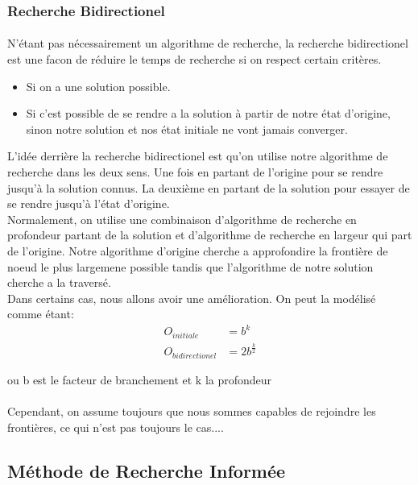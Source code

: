 \documentclass{book}
\begin{document}
\subsubsection{Recherche Bidirectionel}
\paragraph{}
N'étant pas nécessairement un algorithme de recherche, la recherche bidirectionel est une facon de réduire le temps de recherche si on respect certain critères.
\begin{itemize}
\item Si on a une solution possible.
\item Si c'est possible de se rendre a la solution à partir de notre état d'origine, sinon notre solution et nos état initiale ne vont jamais converger.
\end{itemize}
 L'idée derrière la recherche bidirectionel est qu'on utilise notre algorithme de recherche dans les deux sens. Une fois en partant de l'origine pour se rendre jusqu'à la solution connus. La deuxième en partant de la solution pour essayer de se rendre jusqu'à l'état d'origine. \\
 
Normalement, on utilise une combinaison d'algorithme de recherche en profondeur partant de la solution et d'algorithme de recherche en largeur qui part de l'origine. Notre algorithme d'origine cherche a approfondire la frontière de noeud le plus largemene possible tandis que l'algorithme de notre solution cherche a la traversé. \\

Dans certains cas, nous allons avoir une amélioration. On peut la modélisé comme étant:
\begin{align*}
O_{initiale} &= b^{k} \\
O_{bidirectionel} &= 2b^{\frac{k}{2}}
\end{align*}
\begin{center}
ou b est le facteur de branchement et k la profondeur
\end{center}

\paragraph{}
Cependant, on assume toujours que nous sommes capables de rejoindre les frontières, ce qui n'est pas toujours le cas....

\subsection{Méthode de Recherche Informée}
\end{document}
